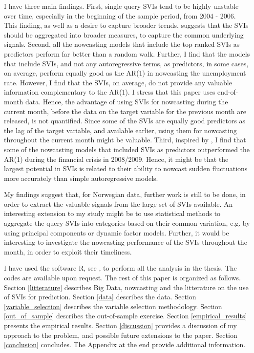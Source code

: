I have three main findings. First, single query SVIs tend to be highly unstable over time, especially in the beginning of the sample period, from 2004 - 2006. This finding, as well as a desire to capture broader trends, suggests that the SVIs should be aggregated into broader measures, to capture the common underlying signals. Second, all the nowcasting models that include the top ranked SVIs as predictors perform far better than a random walk. Further, I find that the models that include SVIs, and not any autoregressive terms,  as predictors, in some cases, on average, perform equally good as the AR(1) in nowcasting the unemployment rate. However, I find that the SVIs, on average, do not provide any valuable information complementary to the AR(1). I stress that this paper uses end-of-month data. Hence, the advantage of using SVIs for nowcasting during the current month, before the data on the target variable for the previous month are released, is not quantified. Since some of the SVIs are equally good predictors as the lag of the target variable, and available earlier, using them for nowcasting throughout the current month might be valuable. Third, inspired by \textcite{choi2012}, I find that some of the nowcasting models that included SVIs as predictors outperformed the AR(1) during the financial crisis in 2008/2009. Hence, it might be that the largest potential in SVIs is related to their ability to nowcast sudden fluctuations more accurately than simple autoregressive models. 

My findings suggest that, for Norwegian data, further work is still to be done, in order to extract the valuable signals from the large set of SVIs available. An interesting extension to my study might be to use statistical methods to aggregate the query SVIs into categories based on their common variation, e.g. by using principal components or dynamic factor models. Further, it would be interesting to investigate the nowcasting performance of the SVIs throughout the month, in order to exploit their timeliness.

I have used the software R, see \textcite{r}, to perform all the analysis in the thesis. The codes are available upon request. The rest of this paper is organized as follows. Section \ref{litterature} describes Big Data, nowcasting and the litterature on the use of SVIs for prediction. Section \ref{data} describes the data. Section \ref{variable_selection} describes the variable selection methodology. Section \ref{out_of_sample} describes the out-of-sample exercise. Section \ref{empirical_results} presents the empirical results. Section \ref{discussion} provides a discussion of my approach to the problem, and possible future extensions to the paper. Section \ref{conclusion} concludes. The Appendix at the end provide additional information.